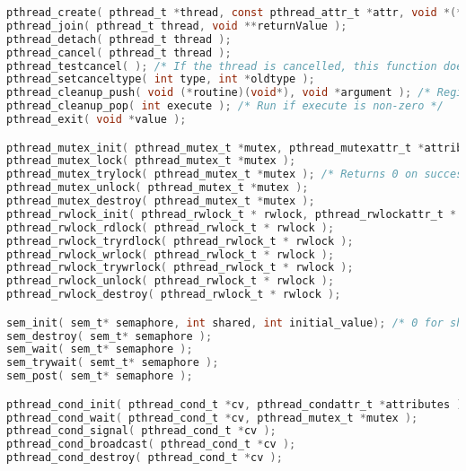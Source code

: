 \documentclass[legalpaper,10pt]{article}
\begin{document}
\begin{lstlisting}[language=C]
pthread_create( pthread_t *thread, const pthread_attr_t *attr, void *(*start_routine)( void * ), void *arg );
pthread_join( pthread_t thread, void **returnValue );
pthread_detach( pthread_t thread );
pthread_cancel( pthread_t thread );
pthread_testcancel( ); /* If the thread is cancelled, this function does not return (thread terminated) */
pthread_setcanceltype( int type, int *oldtype );
pthread_cleanup_push( void (*routine)(void*), void *argument ); /* Register cleanup handler, with argument */ 
pthread_cleanup_pop( int execute ); /* Run if execute is non-zero */
pthread_exit( void *value );

pthread_mutex_init( pthread_mutex_t *mutex, pthread_mutexattr_t *attributes );
pthread_mutex_lock( pthread_mutex_t *mutex );
pthread_mutex_trylock( pthread_mutex_t *mutex ); /* Returns 0 on success */
pthread_mutex_unlock( pthread_mutex_t *mutex );
pthread_mutex_destroy( pthread_mutex_t *mutex );
pthread_rwlock_init( pthread_rwlock_t * rwlock, pthread_rwlockattr_t * attr );
pthread_rwlock_rdlock( pthread_rwlock_t * rwlock );
pthread_rwlock_tryrdlock( pthread_rwlock_t * rwlock );
pthread_rwlock_wrlock( pthread_rwlock_t * rwlock );
pthread_rwlock_trywrlock( pthread_rwlock_t * rwlock );
pthread_rwlock_unlock( pthread_rwlock_t * rwlock );
pthread_rwlock_destroy( pthread_rwlock_t * rwlock );

sem_init( sem_t* semaphore, int shared, int initial_value); /* 0 for shared OK */
sem_destroy( sem_t* semaphore );
sem_wait( sem_t* semaphore );
sem_trywait( semt_t* semaphore );
sem_post( sem_t* semaphore );

pthread_cond_init( pthread_cond_t *cv, pthread_condattr_t *attributes );
pthread_cond_wait( pthread_cond_t *cv, pthread_mutex_t *mutex );
pthread_cond_signal( pthread_cond_t *cv );
pthread_cond_broadcast( pthread_cond_t *cv );
pthread_cond_destroy( pthread_cond_t *cv );
\end{lstlisting}
\end{document}
